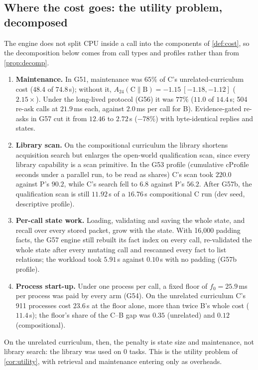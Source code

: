 \documentclass[11pt]{article}
\theoremstyle{remark}
\begin{document}
\subsection{Where the cost goes: the utility problem, decomposed}\label{sec:pl-decomp}
The engine does not split CPU inside a call into the components of \cref{def:cost}, so the decomposition below comes from call types and profiles rather than from \cref{prop:decomp}.
\begin{enumerate}[leftmargin=*,itemsep=1pt]
\item \textbf{Maintenance.} In G51, maintenance was $65\%$ of C's unrelated-curriculum cost ($48.4$ of $74.8$\,s); without it, $A_{24}(\text{C}\|\text{B})=-1.15\ [-1.18,-1.12]$ ($2.15\times$). Under the long-lived protocol (G56) it was $77\%$ ($11.0$ of $14.4$\,s; 504 re-ask calls at $21.9$\,ms each, against $2.0$\,ms per call for B). Evidence-gated re-asks in G57 cut it from $12.46$ to $2.72$\,s ($-78\%$) with byte-identical replies and states.
\item \textbf{Library scan.} On the compositional curriculum the library shortens acquisition search but enlarges the open-world qualification scan, since every library capability is a scan primitive. In the G53 profile (cumulative cProfile seconds under a parallel run, to be read as shares) C's scan took $220.0$ against P's $90.2$, while C's search fell to $6.8$ against P's $56.2$. After G57b, the qualification scan is still $11.92$\,s of a $16.76$\,s compositional C run (dev seed, descriptive profile).
\item \textbf{Per-call state work.} Loading, validating and saving the whole state, and recall over every stored packet, grow with the state. With 16{,}000 padding facts, the G57 engine still rebuilt its fact index on every call, re-validated the whole state after every mutating call and rescanned every fact to list relations; the workload took $5.91$\,s against $0.10$\,s with no padding (G57b profile).
\item \textbf{Process start-up.} Under one process per call, a fixed floor of $f_0=25.9$\,ms per process was paid by every arm (G54). On the unrelated curriculum C's 911 processes cost $23.6$\,s at the floor alone, more than twice B's whole cost ($11.4$\,s); the floor's share of the C--B gap was $0.35$ (unrelated) and $0.12$ (compositional).
\end{enumerate}
On the unrelated curriculum, then, the penalty is state size and maintenance, not library search: the library was used on $0$ tasks. This is the utility problem of \cref{cor:utility}, with retrieval and maintenance entering only as overheads.
\end{document}
